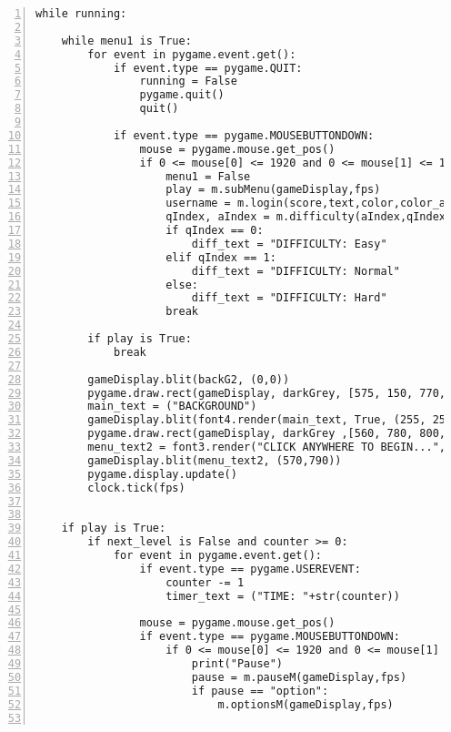 \documentclass[12pt]{report}
\begin{document}
\begin{Verbatim}[numbers=left, frame=single]
while running:

    while menu1 is True:
        for event in pygame.event.get():
            if event.type == pygame.QUIT:                                                               
                running = False
                pygame.quit()
                quit()
                                
            if event.type == pygame.MOUSEBUTTONDOWN:
                mouse = pygame.mouse.get_pos()
                if 0 <= mouse[0] <= 1920 and 0 <= mouse[1] <= 1080:
                    menu1 = False
                    play = m.subMenu(gameDisplay,fps)
                    username = m.login(score,text,color,color_active,color_inactive,active,gameDisplay,fps)
                    qIndex, aIndex = m.difficulty(aIndex,qIndex,gameDisplay,fps)
                    if qIndex == 0:
                        diff_text = "DIFFICULTY: Easy"
                    elif qIndex == 1:
                        diff_text = "DIFFICULTY: Normal"
                    else:
                        diff_text = "DIFFICULTY: Hard"
                    break
                
        if play is True:
            break

        gameDisplay.blit(backG2, (0,0))
        pygame.draw.rect(gameDisplay, darkGrey, [575, 150, 770, 110])
        main_text = ("BACKGROUND")
        gameDisplay.blit(font4.render(main_text, True, (255, 255, 255)), (587, 165))
        pygame.draw.rect(gameDisplay, darkGrey ,[560, 780, 800, 60])
        menu_text2 = font3.render("CLICK ANYWHERE TO BEGIN...", True, white)
        gameDisplay.blit(menu_text2, (570,790))
        pygame.display.update()                                                                         
        clock.tick(fps)


    if play is True:                    
        if next_level is False and counter >= 0:
            for event in pygame.event.get():
                if event.type == pygame.USEREVENT:
                    counter -= 1
                    timer_text = ("TIME: "+str(counter))
                    
                mouse = pygame.mouse.get_pos()
                if event.type == pygame.MOUSEBUTTONDOWN:
                    if 0 <= mouse[0] <= 1920 and 0 <= mouse[1] <= 1080:
                        print("Pause")
                        pause = m.pauseM(gameDisplay,fps)
                        if pause == "option":
                            m.optionsM(gameDisplay,fps)
                                                

\end{Verbatim}
\end{document}
